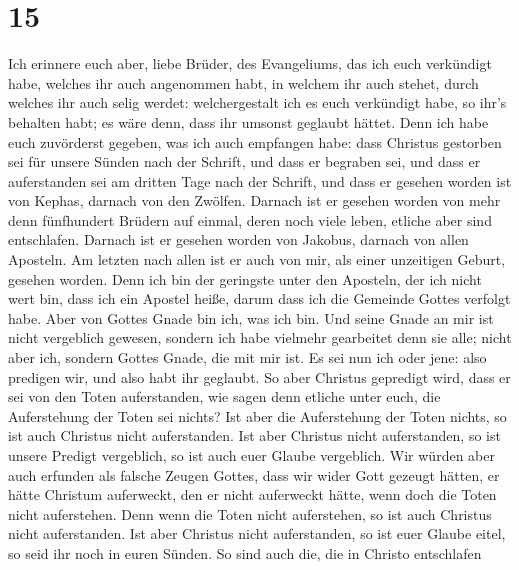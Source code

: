 \hypertarget{section-14}{%
\section{15}\label{section-14}}

 Ich erinnere euch aber, liebe Brüder, des Evangeliums,
das ich euch verkündigt habe, welches ihr auch angenommen habt, in
welchem ihr auch stehet,  durch welches ihr auch selig
werdet: welchergestalt ich es euch verkündigt habe, so ihr's behalten
habt; es wäre denn, dass ihr umsonst geglaubt hättet. 
Denn ich habe euch zuvörderst gegeben, was ich auch empfangen habe: dass
Christus gestorben sei für unsere Sünden nach der Schrift,
 und dass er begraben sei, und dass er auferstanden sei am
dritten Tage nach der Schrift,  und dass er gesehen worden
ist von Kephas, darnach von den Zwölfen.  Darnach ist er
gesehen worden von mehr denn fünfhundert Brüdern auf einmal, deren noch
viele leben, etliche aber sind entschlafen.  Darnach ist
er gesehen worden von Jakobus, darnach von allen Aposteln.
 Am letzten nach allen ist er auch von mir, als einer
unzeitigen Geburt, gesehen worden.  Denn ich bin der
geringste unter den Aposteln, der ich nicht wert bin, dass ich ein
Apostel heiße, darum dass ich die Gemeinde Gottes verfolgt habe.
 Aber von Gottes Gnade bin ich, was ich bin. Und seine
Gnade an mir ist nicht vergeblich gewesen, sondern ich habe vielmehr
gearbeitet denn sie alle; nicht aber ich, sondern Gottes Gnade, die mit
mir ist.  Es sei nun ich oder jene: also predigen wir,
und also habt ihr geglaubt.  So aber Christus gepredigt
wird, dass er sei von den Toten auferstanden, wie sagen denn etliche
unter euch, die Auferstehung der Toten sei nichts?  Ist
aber die Auferstehung der Toten nichts, so ist auch Christus nicht
auferstanden.  Ist aber Christus nicht auferstanden, so
ist unsere Predigt vergeblich, so ist auch euer Glaube vergeblich.
 Wir würden aber auch erfunden als falsche Zeugen Gottes,
dass wir wider Gott gezeugt hätten, er hätte Christum auferweckt, den er
nicht auferweckt hätte, wenn doch die Toten nicht auferstehen.
 Denn wenn die Toten nicht auferstehen, so ist auch
Christus nicht auferstanden.  Ist aber Christus nicht
auferstanden, so ist euer Glaube eitel, so seid ihr noch in euren
Sünden.  So sind auch die, die in Christo entschlafen

